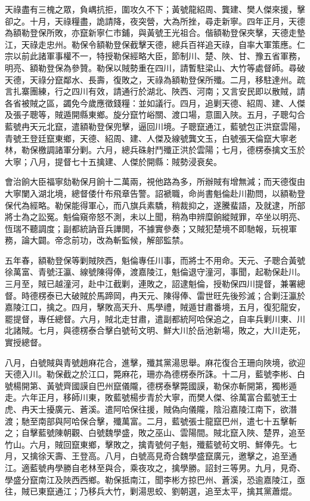 \begin{pinyinscope}
天祿盡有三槐之眾，負嵎抗拒，圍攻久不下；黃號龍紹周、龔建、樊人傑來援，擊卻之。十月，天祿糧盡，詭請降，夜突營，大為所挫，尋走新寧。四年正月，天德為額勒登保所敗，亦竄新寧仁市鋪，與黃號王光祖合。偕額勒登保夾擊，天德走墊江，天祿走忠州。勒保令額勒登保截擊天德，總兵百祥追天祿，自率大軍策應。仁宗以前此諸軍事權不一，特授勒保經略大臣，節制川、楚、陜、甘、豫五省軍務，明亮、額勒登保為參贊。勒保以賊勢重在四川，請暫駐梁山、大竹等處督師。尋破天德，天祿分竄鄰水、長壽，復敗之，天祿為額勒登保所殲。二月，移駐達州。疏言扎寨團練，行之四川有效，請通行於湖北、陜西、河南；又言安民即以散賊，請各省被賊之區，蠲免今歲應徵錢糧：並如議行。四月，追剿天德、紹周、建、人傑及張子聰等，賊遁開縣東鄉。旋分竄竹峪關、渡口場，意圖入陜。五月，子聰勾合藍號冉天元北竄，遣額勒登保兜擊，逼回川境。子聰竄通江，藍號包正洪竄雲陽，青號王登廷竄東鄉，天德、紹周、建、人傑及線號龔文玉，白號張天倫竄大寧老林，勒保檄調諸軍分剿。六月，總兵硃射鬥殲正洪於雲陽；七月，德楞泰擒文玉於大寧；八月，提督七十五擒建、人傑於開縣：賊勢浸衰矣。

會治餉大臣福寧劾勒保月餉十二萬兩，視他路為多，所辦賊有增無減；而天德復由大寧闌入湖北境，總督倭什布飛章告警。詔褫職，命尚書魁倫赴川勘問，以額勒登保代為經略。勒保能得軍心，而八旗兵素驕，稍裁抑之，遂騰蜚語，及就逮，所部將士為之訟冤。魁倫窺帝怒不測，未以上聞，稍為申辨糜餉縱賊罪，卒坐以明亮、恆瑞不聽調度；副都統訥音兵譁閧，不據實參奏；又賊犯楚境不即馳報，玩視軍務，論大闢。帝念前功，改為斬監候，解部監禁。

五年春，額勒登保等剿賊陜西，魁倫專任川事，而將士不用命。天元、子聰合黃號徐萬富、青號汪瀛、線號陳得俸，渡嘉陵江，魁倫退守潼河，事聞，起勒保赴川。三月至，賊已越潼河，赴中江截剿，連敗之，詔逮魁倫，授勒保四川提督，兼署總督。時德楞泰已大破賊於馬蹄岡，冉天元、陳得俸、雷世旺先後殄滅；合剿汪瀛於嘉陵江口，擒之。四月，擊敗高天升、馬學禮，賊遁甘肅番境，五月，復犯龍安，罷提督，專任總督。六月，賊北走甘肅，遣副都統阿哈保追之，自率兵剿川東、川北諸賊。七月，與德楞泰合擊白號茍文明、鮮大川於岳池新場，敗之，大川走死，實授總督。

八月，白號賊與青號趙麻花合，進擊，殲其黨湯思舉。麻花復合王珊向陜境，欲迎天德入川。勒保截之於江口，斃麻花，珊亦為德楞泰所誅。十二月，藍號李彬、白號楊開第、黃號齊國謨自巴州竄儀隴，德楞泰擊斃國謨，勒保亦斬開第，獨彬遁走。六年正月，移師川東，敗藍號楊步青於大寧，而樊人傑、徐萬富合藍號王士虎、冉天士擾廣元、蒼溪。遣阿哈保往援，賊偽向儀隴，陰沿嘉陵江南下，欲潛渡；馳至南部與阿哈保合擊，殲萬富。二月，藍號張士龍竄巴州，遣七十五擊斬之；自擊藍號陳朝觀、白號魏學盛，敗之巫山、雲陽間。賊北竄入陜、楚界，追至竹山。六月，賊回竄東鄉，擊敗之，擒青號何子魁，殲藍號茍文明、鮮俸先。七月，又擒徐天壽、王登高。八月，白號高見奇合魏學盛竄廣元，邀擊之，追至通江。適藍號冉學勝自老林至與合，乘夜攻之，擒學勝。詔封三等男。九月，見奇、學盛分竄南江及陜西西鄉。勒保抵南江，聞李彬方掠巴州、蒼溪，恐逾嘉陵江，亟往，賊已東竄通江；乃移兵大竹，剿湯思蛟、劉朝選，追至太平，擒其黨蕭焜。


\end{pinyinscope}
